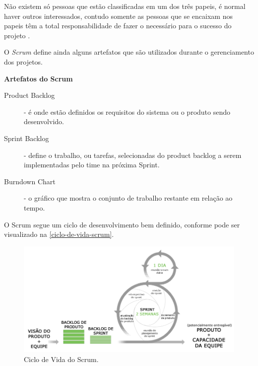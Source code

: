 \documentclass[
	article,			%
	11pt,				%
	oneside,			%
	a4paper,			%
	english,			%
	brazil,				%
	sumario=tradicional
	]{abntex2}
\begin{document}
Não existem só pessoas que estão classificadas em um dos três papeis, é normal
haver outros interessados, contudo somente as pessoas que se encaixam nos
papeis têm a total responsabilidade de fazer o necessário para o sucesso do
projeto \cite{schwaber2002agile}.

O \textit{Scrum} define ainda alguns artefatos que são utilizados durante o
gerenciamento dos projetos.

\textbf{Artefatos do Scrum}

\begin{description}
   \item[Product Backlog] - é onde estão definidos os requisitos do sistema ou o
   produto sendo desenvolvido.
   \item[Sprint Backlog] - define o trabalho, ou tarefas, selecionadas do
   product backlog a serem implementadas pelo time na próxima Sprint.
   \item[Burndown Chart] - o gráfico que mostra o conjunto de trabalho restante
   em relação ao tempo.
\end{description}



O Scrum segue um ciclo de desenvolvimento bem definido, conforme pode ser
visualizado na \autoref{ciclo-de-vida-scrum}.

\begin{figure}[htb]
   \caption{Ciclo de Vida do Scrum.}
   \label{ciclo-de-vida-scrum}
   \begin{center}
       \includegraphics[scale=0.4]{ciclodevidascrum.png}
   \end{center}
\end{figure}
\end{document}
